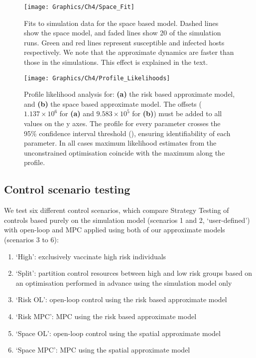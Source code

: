 \begin{figure}[h]
    \begin{center}
        \texttt{[image: Graphics/Ch4/Space\_Fit]}
        \caption{Fits to simulation data for the space based model. Dashed lines show the space model, and faded lines show 20 of the simulation runs. Green and red lines represent susceptible and infected hosts respectively. We note that the approximate dynamics are faster than those in the simulations. This effect is explained in the text. }
        \label{fig:space_fit}
    \end{center}
\end{figure}

\begin{figure}[h]
    \begin{center}
        \texttt{[image: Graphics/Ch4/Profile\_Likelihoods]}
        \caption{Profile likelihood analysis for: \textbf{(a)} the risk based approximate model, and \textbf{(b)} the space based approximate model. The offsets ($1.137\times10^6$ for \textbf{(a)} and $9.583\times10^5$ for \textbf{(b)}) must be added to all values on the y axes. The profile for every parameter crosses the 95\% confidence interval threshold (), ensuring identifiability of each parameter. In all cases maximum likelihood estimates from the unconstrained optimisation coincide with the maximum along the profile.}
        \label{fig:profile_lik}
    \end{center}
\end{figure}

\subsection{Control scenario testing}

We test six different control scenarios, which compare Strategy Testing of controls based purely on the simulation model (scenarios 1 and 2, `user-defined') with open-loop and MPC applied using both of our approximate models (scenarios 3 to 6):
\begin{enumerate}
    \setlength{\itemsep}{3pt}%
    \setlength{\parskip}{3pt}%
    \setlength{\parsep}{3pt}%
    \item{}`High': exclusively vaccinate high risk individuals
    \item{}`Split': partition control resources between high and low risk groups based on an optimisation performed in advance using the simulation model only
    \item{}`Risk OL': open-loop control using the risk based approximate model
    \item{}`Risk MPC': MPC using the risk based approximate model
    \item{}`Space OL': open-loop control using the spatial approximate model
    \item{}`Space MPC': MPC using the spatial approximate model
\end{enumerate}

